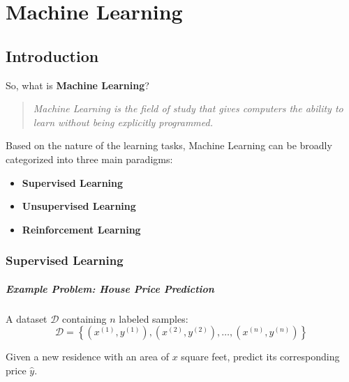 \documentclass[12pt,a4paper]{report}
\begin{document}
\tableofcontents 

\newpage %

\setcounter{part}{0}

\chapter{Machine Learning}

\section{Introduction}
So, what is \textbf{Machine Learning}?

\begin{quote}
    \emph{Machine Learning is the field of study that gives computers the ability to learn without being explicitly programmed.}
\end{quote}

Based on the nature of the learning tasks, Machine Learning can be broadly categorized into three main paradigms:
\begin{itemize}[itemsep=2pt, topsep=4pt]
    \item \textbf{Supervised Learning}
    \item \textbf{Unsupervised Learning}
    \item \textbf{Reinforcement Learning}
\end{itemize}

\subsection{Supervised Learning}

\paragraph{Example Problem: House Price Prediction}
\begin{description}[style=nextline, leftmargin=1.5cm, itemsep=4pt]
    \item[Given:] A dataset $\mathcal{D}$ containing $n$ labeled samples:
    \begin{equation*}
        \mathcal{D} = \left\{ \left(x^{(1)}, y^{(1)}\right), \left(x^{(2)}, y^{(2)}\right), \dots, \left(x^{(n)}, y^{(n)}\right) \right\}
    \end{equation*}
    \item[Task:] Given a new residence with an area of $x$ square feet, predict its corresponding price $\hat{y}$.
\end{description}
\end{document}
